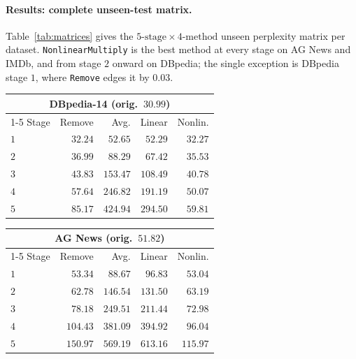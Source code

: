 \documentclass[10pt,a4paper]{article}
\newcommand{\removeop}{\texttt{Remove}}
\newcommand{\nlop}{\texttt{NonlinearMultiply}}
\begin{document}
\paragraph{Results: complete unseen-test matrix.} Table~\ref{tab:matrices}
gives the $5\text{-stage}\times4\text{-method}$ unseen
perplexity matrix per dataset. \nlop{} is the best method at every stage on AG
News and IMDb, and from stage $2$ onward on DBpedia; the single exception is
DBpedia stage $1$, where \removeop{} edges it by $0.03$.

\begin{table}[t]
\centering
\small
\begin{minipage}[t]{0.48\textwidth}
\centering
\begin{tabular}{lrrrr}
\toprule
\multicolumn{5}{c}{\textbf{DBpedia-14} (orig.\ $30.99$)}\\
\cmidrule(lr){1-5}
Stage & Remove & Avg. & Linear & Nonlin. \\
\midrule
$1$ & $\mathbf{32.24}$ & $52.65$ & $52.29$ & $32.27$ \\
$2$ & $36.99$ & $88.29$ & $67.42$ & $\mathbf{35.53}$ \\
$3$ & $43.83$ & $153.47$& $108.49$& $\mathbf{40.78}$ \\
$4$ & $57.64$ & $246.82$& $191.19$& $\mathbf{50.07}$ \\
$5$ & $85.17$ & $424.94$& $294.50$& $\mathbf{59.81}$ \\
\bottomrule
\end{tabular}
\end{minipage}\hfill
\begin{minipage}[t]{0.48\textwidth}
\centering
\begin{tabular}{lrrrr}
\toprule
\multicolumn{5}{c}{\textbf{AG News} (orig.\ $51.82$)}\\
\cmidrule(lr){1-5}
Stage & Remove & Avg. & Linear & Nonlin. \\
\midrule
$1$ & $53.34$ & $88.67$ & $96.83$ & $\mathbf{53.04}$ \\
$2$ & $62.78$ & $146.54$& $131.50$& $\mathbf{63.19}$ \\
$3$ & $78.18$ & $249.51$& $211.44$& $\mathbf{72.98}$ \\
$4$ & $104.43$& $381.09$& $394.92$& $\mathbf{96.04}$ \\
$5$ & $150.97$& $569.19$& $613.16$& $\mathbf{115.97}$\\
\bottomrule
\end{tabular}
\end{minipage}


\end{table}
\end{document}
